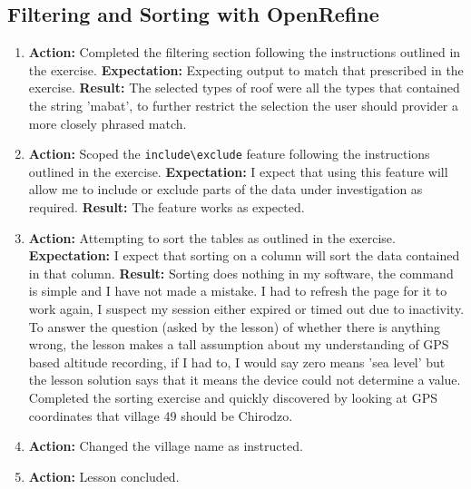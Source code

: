 \documentclass{article}
\begin{document}
\subsection{Filtering and Sorting with OpenRefine}
\begin{enumerate}
    \item \textbf{Action: }Completed the filtering section following the instructions outlined in the exercise.
    \subitem \textbf{Expectation: }Expecting output to match that prescribed in the exercise.
    \subitem \textbf{Result: } The selected types of roof were all the types that contained the string 'mabat', to further restrict the selection the user should provider a more closely phrased match.
    \item \textbf{Action: }Scoped the \verb|include\exclude| feature following the instructions outlined in the exercise.
    \subitem \textbf{Expectation: }I expect that using this feature will allow me to include or exclude parts of the data under investigation as required.
    \subitem \textbf{Result: }The feature works as expected.
    \item \textbf{Action: }Attempting to sort the tables as outlined in the exercise.
    \subitem \textbf{Expectation: }I expect that sorting on a column will sort the data contained in that column.
    \subitem \textbf {Result: }Sorting does nothing in my software, the command is simple and I have not made a mistake. I had to refresh the page for it to work again, I suspect my session either expired or timed out due to inactivity. To answer the question (asked by the lesson) of whether there is anything wrong, the lesson makes a tall assumption about my understanding of GPS based altitude recording, if I had to, I would say zero means 'sea level' but the lesson solution says that it means the device could not determine a value. Completed the sorting exercise and quickly discovered by looking at GPS coordinates that village 49 should be Chirodzo.
    \item \textbf{Action: }Changed the village name as instructed.
    \item \textbf{Action: }Lesson concluded.
\end{enumerate}
\end{document}
